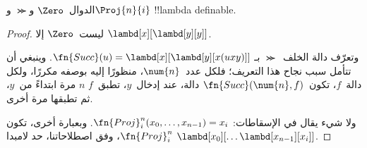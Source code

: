 \documentclass[../../../include/open-logic-section]{subfiles}
\begin{document}

\begin{lem}
الدوال~$\Zero$ و$\Succ$ و$\Proj{n}{i}$ !!{lambda definable}.
\end{lem}

\begin{proof}
ليست~$\Zero$ إلا
$\lambd[x][\lambd[y][y]]$.

وتعرّف دالة الخلف~$\Succ$ بـ
$\fn{Succ}(u) = \lambd[x][\lambd[y][x(uxy)]]$. وينبغي أن تتأمل سبب
نجاح هذا التعريف؛ فلكل عدد~$\num{n}$، منظورًا إليه بوصفه مكررًا، ولكل
دالة~$f$، تكون~$\fn{Succ}(\num{n},f)$ دالة، عند إدخال~$y$، تطبق~$f$
$n$ مرة ابتداءً من~$y$، ثم تطبقها مرة أخرى.

ولا شيء يقال في الإسقاطات:
$\fn{Proj}^n_i(x_0, \dots, x_{n-1}) = x_i$. وبعبارة أخرى، تكون
$\fn{Proj}^n_i$، وفق اصطلاحاتنا، حد لامبدا
$\lambd[x_0][\dots \lambd[x_{n-1}][x_i]]$.
\end{proof}
\end{document}
